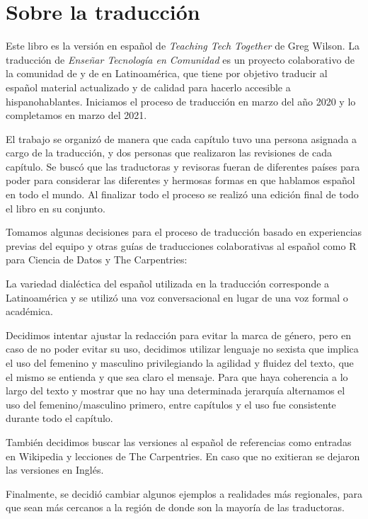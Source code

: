 \chapter*{Sobre la traducción}

Este libro es la versión en español de \emph{Teaching Tech Together} de Greg Wilson.
La traducción de \emph{Enseñar Tecnología en Comunidad} es un proyecto colaborativo
de la comunidad de 
y de  en Latinoamérica,
que tiene por objetivo traducir al español material actualizado y de calidad para hacerlo accesible a hispanohablantes.
Iniciamos el proceso de traducción en marzo del año 2020 y lo completamos en marzo del 2021.

El trabajo se organizó de manera que cada capítulo tuvo una persona asignada a cargo de la traducción,  
y dos personas que realizaron las revisiones de cada capítulo.  
Se buscó que las traductoras y revisoras fueran de diferentes países para poder para considerar las 
diferentes y hermosas formas en que hablamos español en todo el mundo.
Al finalizar todo el proceso se realizó una edición final de todo el libro en su conjunto.

Tomamos algunas decisiones para el proceso de traducción basado en experiencias previas
del equipo y otras guías de traducciones colaborativas al español como {R para Ciencia de Datos}{}
y {The Carpentries}{}:

La variedad dialéctica del español utilizada en la traducción corresponde 
a Latinoamérica y se utilizó una voz conversacional en lugar de una voz formal o académica.

Decidimos intentar ajustar la redacción para evitar la marca de género, pero
en caso de no poder evitar su uso, decidimos utilizar lenguaje no sexista  
que implica el uso del femenino y masculino privilegiando la agilidad y fluidez del texto, 
que el mismo se entienda y que sea claro el mensaje. Para que haya coherencia 
a lo largo del texto y mostrar que no hay una determinada jerarquía 
alternamos el uso del femenino/masculino primero, entre capítulos 
y el uso fue consistente durante todo el capítulo. 

También decidimos buscar las versiones al español de referencias como 
entradas en Wikipedia y lecciones de The Carpentries.  En caso que no exitieran 
se dejaron las versiones en Inglés.

Finalmente, se decidió cambiar algunos ejemplos a realidades más regionales, 
para que sean más cercanos a la región de donde son la mayoría de las
traductoras.

